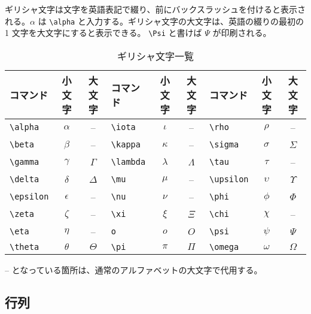 ギリシャ文字は文字を英語表記で綴り、前にバックスラッシュを付けると表示される。\(\alpha\) は \verb|\alpha| と入力する。ギリシャ文字の大文字は、英語の綴りの最初の 1 文字を大文字にすると表示できる。 \verb|\Psi| と書けば \(\Psi\) が印刷される。
\begin{table}[H]
    \centering
    \caption{ギリシャ文字一覧}
    \label{tab:greek}
    \begin{tabular}{|lcc|lcc|lcc|}
        \hline
        コマンド                & 小文字       & 大文字     & コマンド                & 小文字      & 大文字      & コマンド                & 小文字       & 大文字       \\
        \hline \hline
        \verb|\alpha| & \(\alpha\)   & --         & \verb|\iota| & \(\iota\)   & --          & \verb|\rho| & \(\rho\)     & --           \\
        \verb|\beta| & \(\beta\)    & --         & \verb|\kappa| & \(\kappa\)  & --          & \verb|\sigma| & \(\sigma\)   & \(\Sigma\)   \\
        \verb|\gamma| & \(\gamma\)   & \(\Gamma\) & \verb|\lambda| & \(\lambda\) & \(\Lambda\) & \verb|\tau| & \(\tau\)     & --           \\
        \verb|\delta| & \(\delta\)   & \(\Delta\) & \verb|\mu| & \(\mu\)     & --          & \verb|\upsilon| & \(\upsilon\) & \(\Upsilon\) \\
        \verb|\epsilon| & \(\epsilon\) & --         & \verb|\nu| & \(\nu\)     & --          & \verb|\phi| & \(\phi\)     & \(\Phi\)     \\
        \verb|\zeta| & \(\zeta\)    & --         & \verb|\xi| & \(\xi\)     & \(\Xi\)     & \verb|\chi| & \(\chi\)     & --           \\
        \verb|\eta| & \(\eta\)     & --         & \verb|o| & \(o\)       & \(O\)       & \verb|\psi| & \(\psi\)     & \(\Psi\)     \\
        \verb|\theta| & \(\theta\)   & \(\Theta\) & \verb|\pi| & \(\pi\)     & \(\Pi\)     & \verb|\omega| & \(\omega\)   & \(\Omega\)   \\
        \hline
    \end{tabular}
\end{table} \noindent
-- となっている箇所は、通常のアルファベットの大文字で代用する。

\subsection{行列}
\label{sec:latex:matrix}

